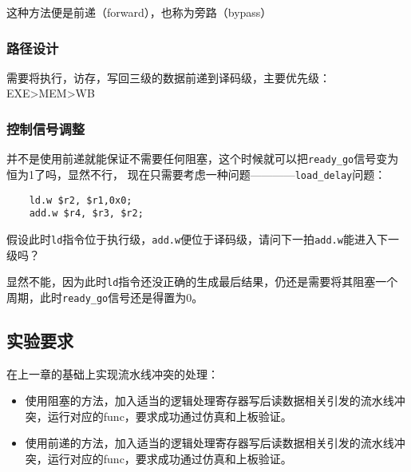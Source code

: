 这种方法便是前递（forward），也称为旁路（bypass）

\subsubsection{路径设计}

需要将执行，访存，写回三级的数据前递到译码级，主要优先级：EXE>MEM>WB

\subsubsection{控制信号调整}

并不是使用前递就能保证不需要任何阻塞，这个时候就可以把\texttt{ready\_go}信号变为恒为1了吗，显然不行，
现在只需要考虑一种问题————\texttt{load\_delay}问题：

\begin{verbatim}
    ld.w $r2, $r1,0x0;
    add.w $r4, $r3, $r2;
\end{verbatim}

假设此时\texttt{ld}指令位于执行级，\texttt{add.w}便位于译码级，请问下一拍\texttt{add.w}能进入下一级吗？

显然不能，因为此时\texttt{ld}指令还没正确的生成最后结果，仍还是需要将其阻塞一个周期，此时\texttt{ready\_go}信号还是得置为0。

\subsection{实验要求}

在上一章的基础上实现流水线冲突的处理：

\begin{itemize}
    \item 使用阻塞的方法，加入适当的逻辑处理寄存器写后读数据相关引发的流水线冲突，运行对应的func，要求成功通过仿真和上板验证。
    \item 使用前递的方法，加入适当的逻辑处理寄存器写后读数据相关引发的流水线冲突，运行对应的func，要求成功通过仿真和上板验证。
\end{itemize}

